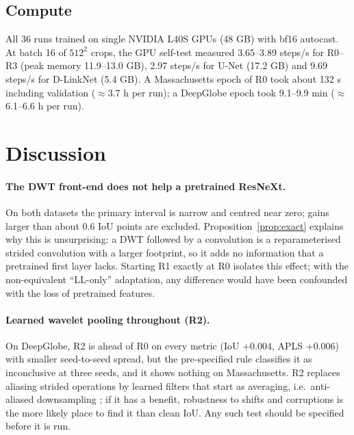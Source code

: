 \documentclass[11pt]{article}
\begin{document}
\subsection{Compute}

All 36 runs trained on single NVIDIA L40S GPUs (48 GB) with bf16 autocast. At batch 16 of $512^2$
crops, the GPU self-test measured 3.65--3.89 steps/s for R0--R3 (peak memory 11.9--13.0 GB),
2.97 steps/s for U-Net (17.2 GB) and 9.69 steps/s for D-LinkNet (5.4 GB). A Massachusetts epoch
of R0 took about 132 s including validation ($\approx$3.7 h per run); a DeepGlobe epoch took
9.1--9.9 min ($\approx$6.1--6.6 h per run).

\section{Discussion}

\paragraph{The DWT front-end does not help a pretrained ResNeXt.} On both datasets the primary
interval is narrow and centred near zero; gains larger than about 0.6 IoU points are excluded.
Proposition~\ref{prop:exact} explains why this is unsurprising: a DWT followed by a convolution
is a reparameterised strided convolution with a larger footprint, so it adds no information that
a pretrained first layer lacks. Starting R1 exactly at R0 isolates this effect; with the
non-equivalent ``LL-only'' adaptation, any difference would have been confounded with the loss of
pretrained features.

\paragraph{Learned wavelet pooling throughout (R2).} On DeepGlobe, R2 is ahead of R0 on every
metric (IoU $+0.004$, APLS $+0.006$) with smaller seed-to-seed spread, but the pre-specified rule
classifies it as inconclusive at three seeds, and it shows nothing on Massachusetts. R2 replaces
aliasing strided operations by learned filters that start as averaging, i.e.\ anti-aliased
downsampling \cite{zhang2019,li2021wavecnet}; if it has a benefit, robustness to shifts and
corruptions is the more likely place to find it than clean IoU. Any such test should be specified
before it is run.
\end{document}
